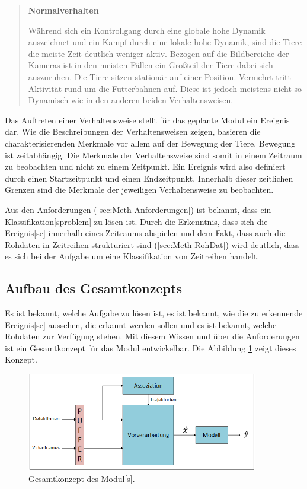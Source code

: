 \begin{quote}
\textbf{Normalverhalten}\par
Während sich ein Kontrollgang durch eine globale hohe Dynamik auszeichnet und ein Kampf durch eine lokale hohe Dynamik, sind die Tiere die meiste Zeit deutlich weniger aktiv. Bezogen auf die Bildbereiche der Kameras ist in den meisten Fällen ein Großteil der Tiere dabei sich auszuruhen. Die Tiere sitzen stationär auf einer Position. Vermehrt tritt Aktivität rund um die Futterbahnen auf. Diese ist jedoch meistens nicht so Dynamisch wie in den anderen beiden Verhaltensweisen.
\end{quote}
\par

Das Auftreten einer Verhaltensweise stellt für das geplante \gls{Modul} ein \gls{Ereignis} dar. Wie die Beschreibungen der Verhaltensweisen zeigen, basieren die charakterisierenden Merkmale vor allem auf der Bewegung der Tiere. Bewegung ist zeitabhängig. Die Merkmale der Verhaltensweise sind somit in einem Zeitraum zu beobachten und nicht zu einem Zeitpunkt. Ein \gls{Ereignis} wird also definiert durch einen Startzeitpunkt und einen Endzeitpunkt. Innerhalb dieser zeitlichen Grenzen sind die Merkmale der jeweiligen Verhaltensweise zu beobachten. \par

Aus den Anforderungen (\autoref{sec:Meth Anforderungen}) ist bekannt, dass ein \gls{Klassifikation}[sproblem] zu lösen ist. Durch die Erkenntnis, dass sich die \gls{Ereignis}[se] innerhalb eines Zeitraums abspielen und dem Fakt, dass auch die Rohdaten in Zeitreihen strukturiert sind (\autoref{sec:Meth RohDat}) wird deutlich, dass es sich bei der Aufgabe um eine \gls{Klassifikation} von Zeitreihen handelt.\par

\subsection{Aufbau des Gesamtkonzepts}
Es ist bekannt, welche Aufgabe zu lösen ist, es ist bekannt, wie die zu erkennende \gls{Ereignis}[se] aussehen, die erkannt werden sollen und es ist bekannt, welche Rohdaten zur Verfügung stehen. Mit diesem Wissen und über die Anforderungen ist ein Gesamtkonzept für das \gls{Modul} entwickelbar. Die Abbildung \ref{fig:GesKonzpt} zeigt dieses Konzept.

\begin{figure}[htb]
    \centering
    \includegraphics[width=0.9\textwidth]{img/Grafiken/Gesamtkonzept start.png}
    \caption{Gesamtkonzept des \gls{Modul}[s].}
    \label{fig:GesKonzpt}
\end{figure}


